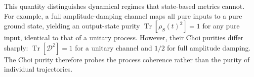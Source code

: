 \documentclass[pra,twocolumn,aps,showpacs,superscriptaddress,longbibliography]{revtex4-2}
\begin{document}
This quantity distinguishes dynamical regimes that state-based metrics cannot. For example, a full amplitude-damping channel maps all pure inputs to a pure ground state, yielding an output-state purity $\operatorname{Tr}[\rho_S(t)^2]=1$ for any pure input, identical to that of a unitary process. However, their Choi purities differ sharply: $\operatorname{Tr}[\mathcal{D}^2]=1$ for a unitary channel and $1/2$ for full amplitude damping. The Choi purity therefore probes the process coherence rather than the purity of individual trajectories.


\end{document}
